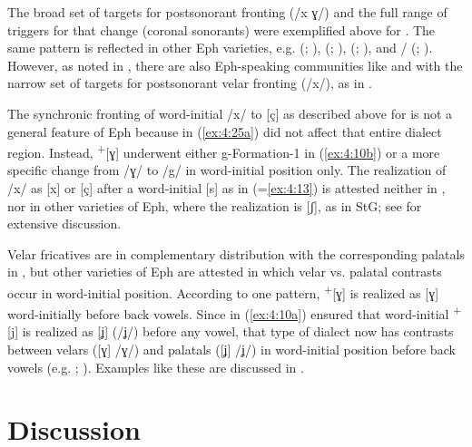 \begin{sloppypar}
The broad set of targets for postsonorant fronting (/x ɣ/) and the full range of triggers for that change (coronal sonorants) were exemplified above for . The same pattern is reflected in other Eph varieties, e.g.  (\citealt{Roloff1902}; ),  (\citealt{Block1910}; ),  (\citealt{Brugge1944}; ), and \slash {} (\citealt{Lange1963}; ). However, as noted in , there are also Eph-speaking communities like  and  with the narrow set of targets for postsonorant velar fronting (/x/), as in .
\end{sloppypar}

The synchronic fronting of word-initial /x/ to [ç] as described above for  is not a general feature of Eph because  in (\ref{ex:4:25a}) did not affect that entire dialect region. Instead,  \textsuperscript{+}[ɣ] underwent either g-For\-ma\-tion-1 in (\ref{ex:4:10b}) or a more specific change from /ɣ/ to /g/ in word-initial position only. The realization of /x/ as [x] or [ç] after a word-initial [s] as in  (=\ref{ex:4:13}) is attested neither in , nor in other varieties of Eph, where the realization is [ʃ], as in StG; see \citet{Hall2021} for extensive discussion.

Velar fricatives are in complementary distribution with the corresponding palatals in , but other varieties of Eph are attested in which velar vs. palatal contrasts occur in word-initial position. According to one pattern,  \textsuperscript{+}[ɣ] is realized as [ɣ] word-initially before back vowels. Since  in (\ref{ex:4:10a}) ensured that word-initial \textsuperscript{+}[j] is realized as [ʝ] (/ʝ/) before any vowel, that type of dialect now has contrasts between velars ([ɣ] /ɣ/) and palatals ([ʝ] /ʝ/) in word-initial position before back vowels (e.g. \citealt{Block1910}; ). Examples like these are discussed in .

\section{Discussion}\label{sec:4.5}

